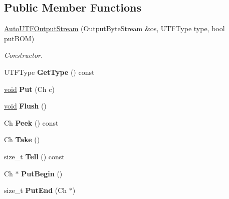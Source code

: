 \subsection*{Public Member Functions}
\begin{DoxyCompactItemize}
\item 
\hyperlink{class_auto_u_t_f_output_stream_a2fe7dbc8e43d11295f66df5653148137}{Auto\+U\+T\+F\+Output\+Stream} (Output\+Byte\+Stream \&os, U\+T\+F\+Type type, bool put\+B\+O\+M)
\begin{DoxyCompactList}\small\item\em Constructor. \end{DoxyCompactList}\item 
\hypertarget{class_auto_u_t_f_output_stream_ac0b150bc3a52534c0e076a02c7708de3}{}U\+T\+F\+Type {\bfseries Get\+Type} () const \label{class_auto_u_t_f_output_stream_ac0b150bc3a52534c0e076a02c7708de3}

\item 
\hypertarget{class_auto_u_t_f_output_stream_ad12b33e48c45bdbf2628fd3d5461041a}{}\hyperlink{_s_d_l__audio_8h_a52835ae37c4bb905b903cbaf5d04b05f}{void} {\bfseries Put} (Ch c)\label{class_auto_u_t_f_output_stream_ad12b33e48c45bdbf2628fd3d5461041a}

\item 
\hypertarget{class_auto_u_t_f_output_stream_a38b54c84ba0c479552256ac092529f47}{}\hyperlink{_s_d_l__audio_8h_a52835ae37c4bb905b903cbaf5d04b05f}{void} {\bfseries Flush} ()\label{class_auto_u_t_f_output_stream_a38b54c84ba0c479552256ac092529f47}

\item 
\hypertarget{class_auto_u_t_f_output_stream_ae94659ad6b20e4a89d59a8c98ea6b580}{}Ch {\bfseries Peek} () const \label{class_auto_u_t_f_output_stream_ae94659ad6b20e4a89d59a8c98ea6b580}

\item 
\hypertarget{class_auto_u_t_f_output_stream_a44ee7d84ba13fece17574d01b7be574b}{}Ch {\bfseries Take} ()\label{class_auto_u_t_f_output_stream_a44ee7d84ba13fece17574d01b7be574b}

\item 
\hypertarget{class_auto_u_t_f_output_stream_a63ab76ef57db6ab2c2899173e916a6a9}{}size\+\_\+t {\bfseries Tell} () const \label{class_auto_u_t_f_output_stream_a63ab76ef57db6ab2c2899173e916a6a9}

\item 
\hypertarget{class_auto_u_t_f_output_stream_a3c7333661dba3d2210f0b287bdd6c1f3}{}Ch $\ast$ {\bfseries Put\+Begin} ()\label{class_auto_u_t_f_output_stream_a3c7333661dba3d2210f0b287bdd6c1f3}

\item 
\hypertarget{class_auto_u_t_f_output_stream_a4b16bda191526c894501fce447e95b8d}{}size\+\_\+t {\bfseries Put\+End} (Ch $\ast$)\label{class_auto_u_t_f_output_stream_a4b16bda191526c894501fce447e95b8d}

\end{DoxyCompactItemize}



